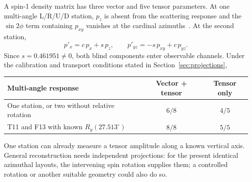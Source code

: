 \documentclass[11pt,a4paper]{article}
\begin{document}
A spin-1 density matrix has three vector and five tensor parameters. At one multi-angle L/R/U/D station, $p_z$ is absent from the scattering response and the $\sin2\phi$ term containing $p_{xy}$ vanishes at the cardinal azimuths~\cite{local}. At the second station,
\begin{equation}
 p'_x=c\,p_x+s\,p_z,\qquad p'_{yz}=-s\,p_{xy}+c\,p_{yz}.
\end{equation}
Since $s=0.461951\ne0$, both blind components enter observable channels. Under the calibration and transport conditions stated in Section~\ref{sec:projections},
\begin{center}
\begin{tabular}{@{}lcc@{}}
\toprule
Multi-angle response & Vector + tensor & Tensor only \\
\midrule
One station, or two without relative rotation & $6/8$ & $4/5$ \\
T11 and F13 with known $R_y(27.513^\circ)$ & $8/8$ & $5/5$ \\
\bottomrule
\end{tabular}
\end{center}
One station can already measure a tensor amplitude along a known vertical axis. General reconstruction needs independent projections: for the present identical azimuthal layouts, the intervening spin rotation supplies them; a controlled rotation or another suitable geometry could also do so.
\end{document}
